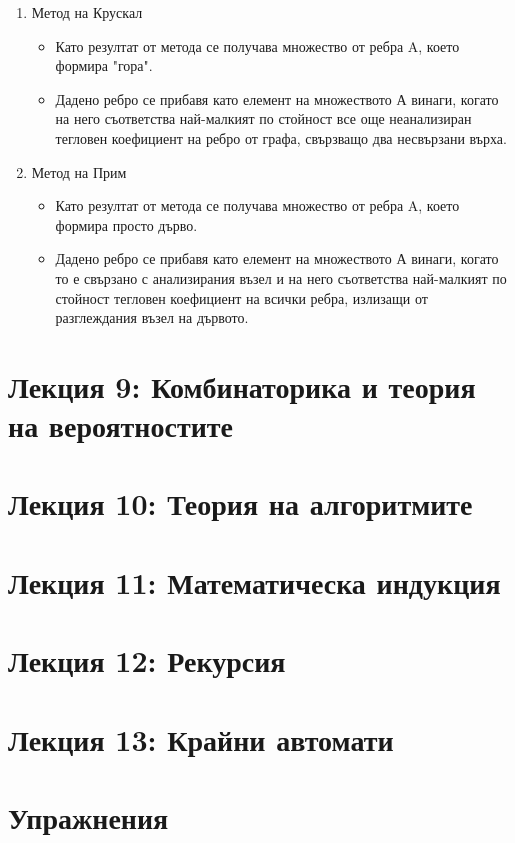 \documentclass[fleqn, 12pt]{article}
\theoremstyle{definition}
\begin{document}
\begin{enumerate}
\item Метод на Крускал
\begin{itemize}
\item Като  резултат от метода се получава множество от ребра A, което формира "гора".
\item Дадено ребро се прибавя като елемент на множеството А винаги, когато на него съответства най-малкият по стойност все още неанализиран тегловен коефициент на ребро от графа,  свързващо два несвързани върха.
\end{itemize}
\item Метод на Прим
\begin{itemize}
\item Като резултат от метода се получава множество от ребра A, което формира просто дърво.
\item Дадено ребро се прибавя като елемент на множеството А винаги, когато  то е свързано с анализирания възел и на него съответства най-малкият по стойност тегловен коефициент на всички ребра, излизащи от разглеждания възел на дървото.
\end{itemize}
\end{enumerate}

\newpage
\section{Лекция 9: Комбинаторика и теория на вероятностите}

\newpage
\section{Лекция 10: Теория на алгоритмите}

\newpage
\section{Лекция 11: Математическа индукция}

\newpage
\section{Лекция 12: Рекурсия}

\newpage
\section{Лекция 13: Крайни автомати}


\newpage
\section{Упражнения}
\end{document}
